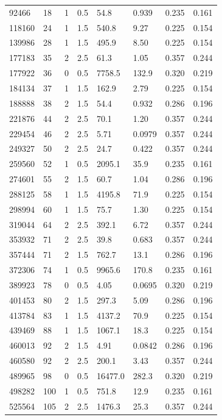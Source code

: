 \documentclass[preview]{standalone}
\begin{document}
{{\begin{tabular}{L{1.2cm}C{1.2cm} C{0.3cm}C{0.5cm} C{1.4cm}C{1.4cm} C{1.4cm}C{1.4cm}}
  92466  &    18  & 1     & 0.5 &  54.8  & 0.939  & 0.235 &  0.161   \\ 
  118160  &    24  & 1     & 1.5 &  540.8  & 9.27  & 0.225 &  0.154   \\ 
  139986  &    28  & 1     & 1.5 &  495.9  & 8.50  & 0.225 &  0.154   \\ 
  177183  &    35  & 2     & 2.5 &  61.3  & 1.05  & 0.357 &  0.244   \\ 
  177922  &    36  & 0     & 0.5 &  7758.5  & 132.9  & 0.320 &  0.219   \\ 
  184134  &    37  & 1     & 1.5 &  162.9  & 2.79  & 0.225 &  0.154   \\ 
  188888  &    38  & 2     & 1.5 &  54.4  & 0.932  & 0.286 &  0.196   \\ 
  221876  &    44  & 2     & 2.5 &  70.1  & 1.20  & 0.357 &  0.244   \\ 
  229454  &    46  & 2     & 2.5 &  5.71  & 0.0979  & 0.357 &  0.244   \\ 
  249327  &    50  & 2     & 2.5 &  24.7  & 0.422  & 0.357 &  0.244   \\ 
  259560  &    52  & 1     & 0.5 &  2095.1  & 35.9  & 0.235 &  0.161   \\ 
  274601  &    55  & 2     & 1.5 &  60.7  & 1.04  & 0.286 &  0.196   \\ 
  288125  &    58  & 1     & 1.5 &  4195.8  & 71.9  & 0.225 &  0.154   \\ 
  298994  &    60  & 1     & 1.5 &  75.7  & 1.30  & 0.225 &  0.154   \\ 
  319044  &    64  & 2     & 2.5 &  392.1  & 6.72  & 0.357 &  0.244   \\ 
  353932  &    71  & 2     & 2.5 &  39.8  & 0.683  & 0.357 &  0.244   \\ 
  357444  &    71  & 2     & 1.5 &  762.7  & 13.1  & 0.286 &  0.196   \\ 
  372306  &    74  & 1     & 0.5 &  9965.6  & 170.8  & 0.235 &  0.161   \\ 
  389923  &    78  & 0     & 0.5 &  4.05  & 0.0695  & 0.320 &  0.219   \\ 
  401453  &    80  & 2     & 1.5 &  297.3  & 5.09  & 0.286 &  0.196   \\ 
  413784  &    83  & 1     & 1.5 &  4137.2  & 70.9  & 0.225 &  0.154   \\ 
  439469  &    88  & 1     & 1.5 &  1067.1  & 18.3  & 0.225 &  0.154   \\ 
  460013  &    92  & 2     & 1.5 &  4.91  & 0.0842  & 0.286 &  0.196   \\ 
  460580  &    92  & 2     & 2.5 &  200.1  & 3.43  & 0.357 &  0.244   \\ 
  489965  &    98  & 0     & 0.5 &  16477.0  & 282.3  & 0.320 &  0.219   \\ 
  498282  &   100  & 1     & 0.5 &  751.8  & 12.9  & 0.235 &  0.161   \\ 
  525564  &   105  & 2     & 2.5 &  1476.3  & 25.3  & 0.357 &  0.244   \\ 
\hline 
\end{tabular} 

}}
\end{document}
